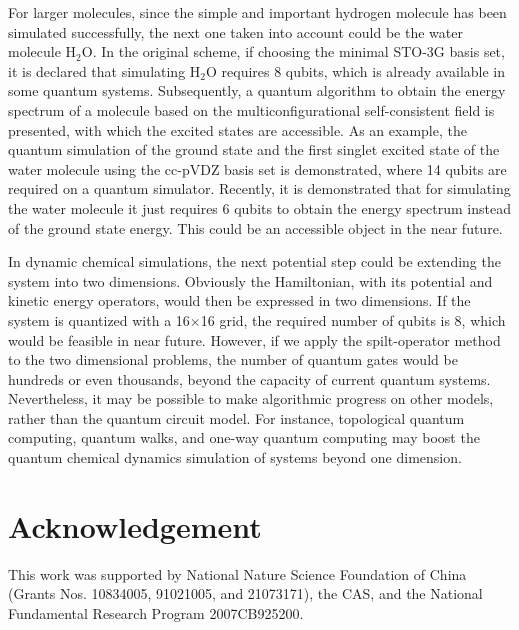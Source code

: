 \documentclass[8.5pt,twoside,twocolumn]{article}
\begin{document}
For larger molecules, since the simple and important hydrogen
molecule has been simulated successfully,
the next one taken into account could be the water molecule H$_2$O.
In the original scheme,\cite{Alan_first}
if choosing the minimal STO-3G basis set,
it is declared that simulating H$_2$O requires 8 qubits,
which is already available in some quantum systems.
Subsequently, a quantum algorithm to obtain the energy spectrum of a
molecule based on the multiconfigurational self-consistent field
is presented,\cite{water_static} with which the excited states are accessible.
As an example, the quantum simulation of the ground state
and the first singlet excited state of the water molecule
using the cc-pVDZ basis set\cite{ccpv} is demonstrated,
where 14 qubits are required on a quantum simulator. Recently, it is demonstrated that  for simulating the water molecule it just requires 6 qubits to obtain the energy spectrum instead of the ground state energy.\cite{water}
This could be an accessible object in the near future.

In dynamic chemical simulations,
the next potential step could be extending the system
into two dimensions. Obviously the Hamiltonian,
with its potential and kinetic energy operators,
would then be expressed in two dimensions.
If the system is quantized with a 16$\times$16 grid,
the required number of qubits is 8,
which would be feasible in near future.
However, if we apply the spilt-operator method\cite{Trotter_1,Trotter_2}
to the two dimensional problems, the number of quantum gates
would be hundreds or even thousands,
beyond the capacity of current quantum systems.
Nevertheless, it may be possible to make algorithmic progress
on other models, rather than the quantum circuit model.
For instance, topological quantum computing,\cite{topological_quantum_computing_1,topological_quantum_computing_2}
quantum walks,\cite{quantum_walks_1,quantum_walks_2,quantum_walks_3,quantum_walks_4}
and one-way quantum computing\cite{one-way_quantum_computing_1,one-way_quantum_computing_2,one-way_quantum_computing_3}
may boost the quantum chemical dynamics simulation of systems
beyond one dimension.

\section{Acknowledgement}

This work was supported by National Nature Science Foundation of
China (Grants Nos. 10834005, 91021005, and 21073171), the CAS, and the National Fundamental Research Program 2007CB925200.
\end{document}
